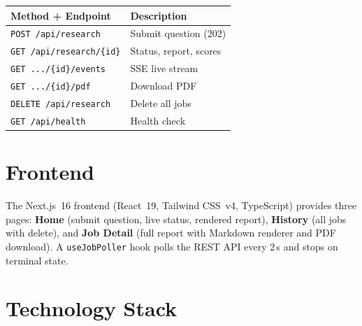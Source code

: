 \documentclass[10pt, twocolumn]{article}
\begin{document}
\begin{center}
\small
\begin{tabular}{ll}
  \toprule
  \textbf{Method + Endpoint} & \textbf{Description} \\
  \midrule
  \texttt{POST /api/research}       & Submit question (202) \\
  \texttt{GET  /api/research/\{id\}}  & Status, report, scores \\
  \texttt{GET  .../\{id\}/events}   & SSE live stream \\
  \texttt{GET  .../\{id\}/pdf}      & Download PDF \\
  \texttt{DELETE /api/research}     & Delete all jobs \\
  \texttt{GET  /api/health}         & Health check \\
  \bottomrule
\end{tabular}
\end{center}

\section{Frontend}

The Next.js~16 frontend (React~19, Tailwind CSS~v4, TypeScript) provides three
pages: \textbf{Home} (submit question, live status, rendered report),
\textbf{History} (all jobs with delete), and \textbf{Job Detail} (full report
with Markdown renderer and PDF download). A \texttt{useJobPoller} hook polls
the REST API every 2\,s and stops on terminal state.

\section{Technology Stack}
\end{document}
